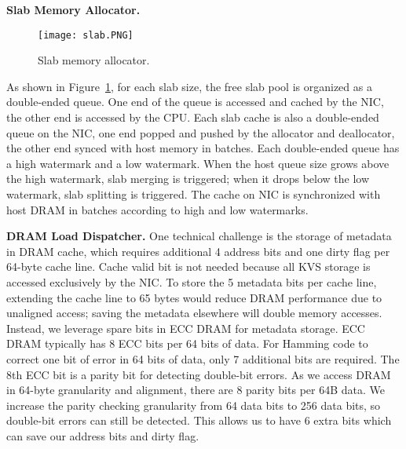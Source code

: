\textbf{Slab Memory Allocator.}

\begin{figure}[t]
\centering
\texttt{[image: slab.PNG]}
\caption{Slab memory allocator.}
\label{fig:slab}
\vspace{-10pt}
\end{figure}

As shown in Figure~\ref{fig:slab}, for each slab size, the free slab pool is organized as a double-ended queue.
One end of the queue is accessed and cached by the NIC, the other end is accessed by the CPU.
Each slab cache is also a double-ended queue on the NIC, one end popped and pushed by the allocator and deallocator, the other end synced with host memory in batches.
Each double-ended queue has a high watermark and a low watermark.
When the host queue size grows above the high watermark, slab merging is triggered; when it drops below the low watermark, slab splitting is triggered.
The cache on NIC is synchronized with host DRAM in batches according to high and low watermarks.


\textbf{DRAM Load Dispatcher.}
One technical challenge is the storage of metadata in DRAM cache, which requires additional 4 address bits and one dirty flag per 64-byte cache line.
Cache valid bit is not needed because all KVS storage is accessed exclusively by the NIC.
To store the 5 metadata bits per cache line, extending the cache line to 65 bytes would reduce DRAM performance due to unaligned access; saving the metadata elsewhere will double memory accesses.
Instead, we leverage spare bits in ECC DRAM for metadata storage.
ECC DRAM typically has 8 ECC bits per 64 bits of data.
For Hamming code to correct one bit of error in 64 bits of data, only 7 additional bits are required.
The 8th ECC bit is a parity bit for detecting double-bit errors.
As we access DRAM in 64-byte granularity and alignment, there are 8 parity bits per 64B data.
We increase the parity checking granularity from 64 data bits to 256 data bits, so double-bit errors can still be detected. This allows us to have 6 extra bits which can save our address bits and dirty flag.

